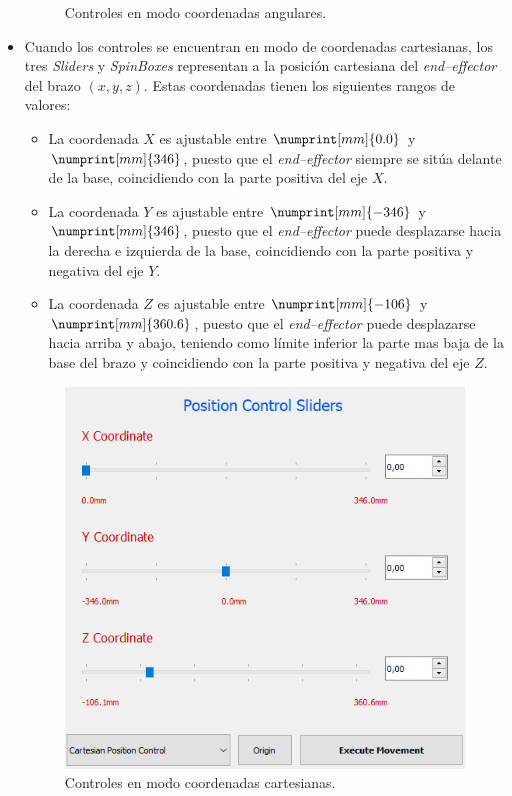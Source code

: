 \begin{itemize}
\begin{figure}[H]
            \caption{Controles en modo coordenadas angulares.}
            \label{fig:ui_joint}
         \end{figure}
        \item Cuando los controles se encuentran en modo de coordenadas cartesianas, los tres \textit{Sliders} y \textit{SpinBoxes} representan a la posición cartesiana del \textit{end--effector} del brazo $(x, y, z)$. Estas coordenadas tienen los siguientes rangos de valores:
        \begin{itemize}
            \item La coordenada $X$ es ajustable entre $\numprint[mm]{0.0}$ y $\numprint[mm]{346}$, puesto que el \textit{end--effector} siempre se sitúa delante de la base, coincidiendo con la parte positiva del eje $X$. 
            \item La coordenada $Y$ es ajustable entre $\numprint[mm]{-346}$ y $\numprint[mm]{346}$, puesto que el \textit{end--effector} puede desplazarse hacia la derecha e izquierda de la base, coincidiendo con la parte positiva y negativa del eje $Y$.
            \item La coordenada $Z$ es ajustable entre $\numprint[mm]{-106}$ y $\numprint[mm]{360.6}$, puesto que el \textit{end--effector} puede desplazarse hacia arriba y abajo, teniendo como límite inferior la parte mas baja de la base del brazo y coincidiendo con la parte positiva y negativa del eje $Z$.
        \end{itemize}
        \begin{figure}[H]
            \centering
            \includegraphics[width=0.55\linewidth]{pictures/Cartesian_Gui.PNG}
            \caption{Controles en modo coordenadas cartesianas.}
            \label{fig:ui_cartesian}
        \end{figure}
    \end{itemize}

